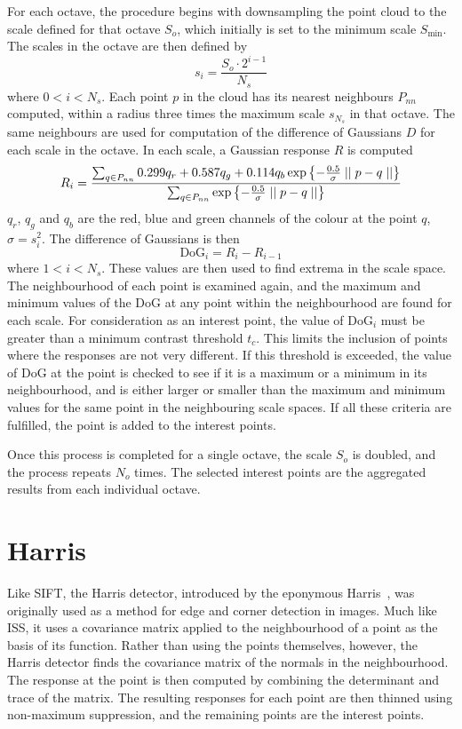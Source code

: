 \documentclass[11pt,a4paper]{kth-mag}
\begin{document}
For each octave, the procedure begins with downsampling the point cloud to the
scale defined for that octave $S_{o}$, which initially is set to the minimum
scale $S_{\min}$. The scales in the octave are then defined by
\begin{equation}
  \label{eq:14}
  s_i=\frac{S_o\cdot 2^{i - 1}}{N_s}
\end{equation}
where $0<i<N_s$. Each point $p$ in the cloud has its nearest neighbours $P_{nn}$ computed,
within a radius three times the maximum scale $s_{N_s}$ in that octave. The same
neighbours are used for computation of the difference of Gaussians $D$ for each
scale in the octave. In each scale, a Gaussian response $R$ is computed
\begin{equation}
  \label{eq:15}
  R_i=\frac{\sum_{q\in P_{nn}}0.299q_r + 0.587q_g +
    0.114q_b\exp\left\{-\frac{0.5}{\sigma}\mid\mid p-q\mid\mid\right\}}{\sum_{q\in P_{nn}}\exp\left\{-\frac{0.5}{\sigma}\mid\mid p-q\mid\mid\right\}}\\
\end{equation}
$q_r$, $q_g$ and $q_b$ are the red, blue and green channels of the colour at the
point $q$, $\sigma=s_i^2$. The difference of Gaussians is then
\begin{equation}
  \label{eq:16}
  \text{DoG}_i=R_i-R_{i-1}
\end{equation}
where $1<i<N_s$. These values are then used to find extrema in the scale space.
The neighbourhood of each point is examined again, and the maximum and minimum
values of the DoG at any point within the neighbourhood are found for each
scale. For consideration as an interest point, the value of DoG$_i$ must be
greater than a minimum contrast threshold $t_c$. This limits the inclusion of
points where the responses are not very different. If this threshold is
exceeded, the value of DoG at the point is checked to see if it is a maximum or
a minimum in its neighbourhood, and is either larger or smaller than the maximum
and minimum values for the same point in the neighbouring scale spaces. If all
these criteria are fulfilled, the point is added to the interest points.

Once this process is completed for a single octave, the scale $S_o$ is doubled,
and the process repeats $N_o$ times. The selected interest points are the
aggregated results from each individual octave. 

\section{Harris}
Like SIFT, the Harris detector, introduced by the eponymous
Harris~\cite{harris1988combined}, was originally used as a method for edge and
corner detection in images. Much like ISS, it uses a covariance matrix applied
to the neighbourhood of a point as the basis of its function. Rather than using
the points themselves, however, the Harris detector finds the covariance matrix
of the normals in the neighbourhood. The response at the point is then computed
by combining the determinant and trace of the matrix. The resulting responses
for each point are then thinned using non-maximum suppression, and the remaining
points are the interest points.
\end{document}
